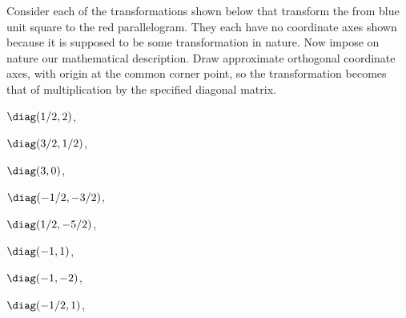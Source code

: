 \begin{exercise} \label{ex:} 
Consider each of the transformations shown below that transform the from blue unit square to the red parallelogram.
They each have no coordinate axes shown because it is supposed to be some transformation in nature. 
Now impose on nature our mathematical description.
Draw approximate orthogonal coordinate axes, with origin at the common corner point, so the transformation becomes that of multiplication by the specified diagonal matrix.
\begin{parts}
\item \(\diag(1/2,2)\),

\item \(\diag(3/2,1/2)\),

\item \(\diag(3,0)\),

\item \(\diag(-1/2,-3/2)\),

\item \(\diag(1/2,-5/2)\),

\item \(\diag(-1,1)\),

\item \(\diag(-1,-2)\),

\item \(\diag(-1/2,1)\),

\end{parts}
\end{exercise}



